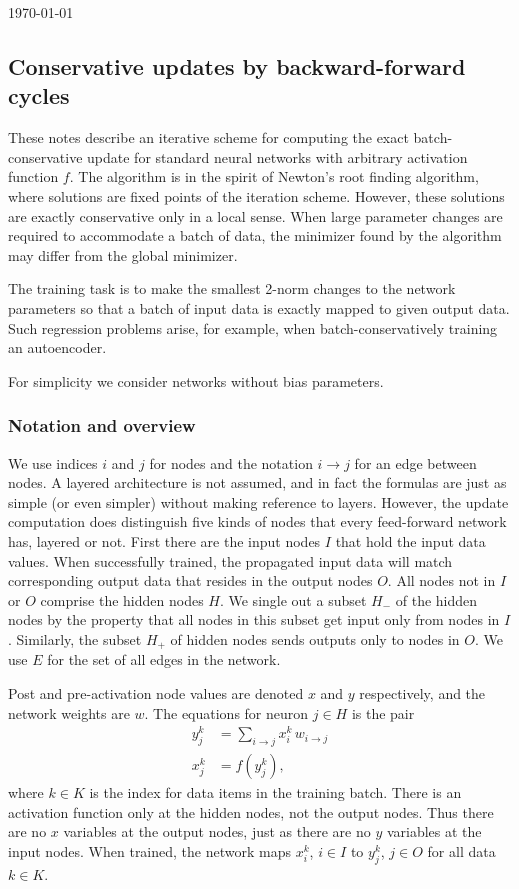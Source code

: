 \documentclass[12pt]{article}
\begin{document}
\today

\subsection*{Conservative updates by backward-forward cycles}

These notes describe an iterative scheme for computing the exact batch-conservative update for standard neural networks with arbitrary activation function $f$. The algorithm is in the spirit of Newton's root finding algorithm, where  solutions are fixed points of the iteration scheme. However, these solutions are exactly conservative only in a local sense. When large parameter changes are required to accommodate a batch of data, the minimizer found by the algorithm may differ from the global minimizer.

The training task is to make the smallest 2-norm changes to the network parameters so that a batch of input data is exactly mapped to given output data. Such regression problems arise, for example, when batch-conservatively training an autoencoder.

For simplicity we consider networks without bias parameters.

\subsubsection*{Notation and overview}

We use indices $i$ and $j$ for nodes and the notation $i\to j$ for an edge between nodes. A layered architecture is not assumed, and in fact the formulas are just as simple (or even simpler) without making reference to layers. However, the update computation does distinguish five kinds of nodes that every feed-forward network has, layered or not. First there are the input nodes $I$ that hold the input data values. When successfully trained, the propagated input data will match  corresponding output data that resides in the output nodes $O$. All nodes not in $I$ or $O$ comprise the hidden nodes $H$. We single out a subset $H_-$ of the hidden nodes by the property that all nodes in this subset get input only from nodes in $I$. Similarly, the subset $H_+$ of hidden nodes sends outputs only to nodes in $O$. We use $E$ for the set of all edges in the network.

Post and pre-activation node values are denoted $x$ and $y$ respectively, and the network weights are $w$. The equations for neuron $j\in H$ is the pair
\begin{subequations}\label{neuron}
\begin{align}
y^k_j&=\sum_{i\to j} x^k_i\, w_{i \to j}\\
x^k_j&=f(y^k_j),
\end{align}
\end{subequations}
where $k\in K$ is the index for data items in the training batch. There is an activation function only at the hidden nodes, not the output nodes. Thus there are no $x$ variables at the output nodes, just as there are no $y$ variables at the input nodes. When trained, the network maps $x^k_i$, $i\in I$ to $y^k_j$, $j\in O$ for all data $k\in K$.
\end{document}
